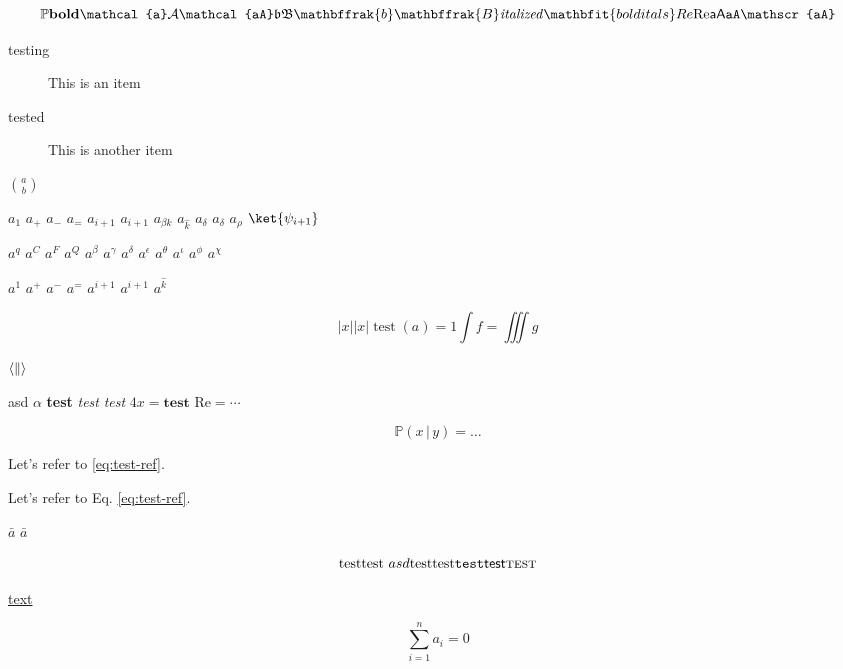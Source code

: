 \documentclass{minimal}
\begin{document}
\begin{equation}
  \mathbb{P}
  \mathbf{bold}
  \mathcal{a}
  \mathcal{A}
  \mathcal{aA}
  \mathfrak{b}
  \mathfrak{B}
  \mathbffrak{b}
  \mathbffrak{B}
  \mathit{italized}
  \mathbfit{bold itals}
  \mathnormal{Re}
  \mathrm{Re}
  \mathsf{aA}
  \mathtt{aA}
  \mathscr{aA}
\end{equation}

\begin{description}
  \item[testing] This is an item
  \item [tested] This is another item
\end{description}

$\binom{a}{b}$

$a_1$
$a_+$
$a_-$
$a_=$
$a_{i + 1}$
$a_{i+1}$
$a_{\beta k}$
$a_{\hat k}$
$a_{\delta}$
$a_\delta$
$a_\rho$
$\ket{\psi_{i+1}}$

$a^q$
$a^C$
$a^F$
$a^Q$
$a^{\beta}$
$a^{\gamma}$
$a^{\delta}$
$a^{\epsilon}$
$a^{\theta}$
$a^{\iota}$
$a^{\phi}$
$a^{\chi}$

$a^1$
$a^+$
$a^-$
$a^=$
$a^{i + 1}$
$a^{i+1}$
$a^{\hat k}$

\begin{equation}
  \lvert x \rvert
  \bigl\lvert x \bigr\rvert
  \operatorname{test}(a) = 1
  \int f = \iiint g
\end{equation}

$\langle \| \\ \rangle$

\textup{asd $\alpha$}
\textbf{test}
\textit{test}
\textsl{test}
$4 \mathit{x} = \mathbf{test}$
$\mathrm{Re} = \cdots$

\begin{equation}
  \mathbb{P}(x \,|\, y) \!= \dots
  \label{eq:test-ref}
\end{equation}

Let's refer to \eqref{eq:test-ref}.

Let's refer to Eq. \ref{eq:test-ref}.

$\bar a$
$\bar{a}$

\begin{equation}
  \text{test}
  \textnormal{test $asd$}
  \textrm{test}
  \textup{test}
  \texttt{test}
  \textsf{test}
  \textsc{test}
\end{equation}

\href{url}{text}


\begin{equation}
  \sum_{i=1}^n a_i = 0
\end{equation}
\end{document}
